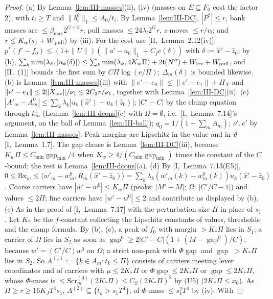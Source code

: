 \documentclass[10pt]{amsart}
\theoremstyle{definition}
\theoremstyle{remark}
\newcommand{\gap}{\operatorname{gap}}
\newcommand{\zh}{\hat z}
\newcommand{\ip}[2]{\langle #1,#2\rangle}
\begin{document}
\begin{proof}
(a) By Lemma~\ref{lem:III-masses}(ii), (iv) (masses on $E\subseteq F_0$ cost the
factor $2$), with $t_i\ge T$ and $\|b^\theta_i\|_1\le A_0/t_i$.  By
Lemma~\ref{lem:III-DC}, $|P^*|\le r$, bank masses are $\le\beta_{\max}2^{G+2}r$,
pull masses $\le24\lambda_l2^Gr$, $z$-moves $\le r/v_l$; and $r\le K_w(s_1+
\overline W_{\rm pull})$ by (iii).  For the cost use [II,~Lemma~2.12(iv)]:
$p^*(f'-f_0)\le(1+\|U\|)(\|a'-a_0\|_1+C_fc(\delta))$ with $\delta:=\hat x'-\zh_0$;
by (b), $\sum_k\min(\lambda_k,|u_k(\delta)|)\le\sum_k\min(\lambda_k,4K_w\Pi)+
2\mathfrak t(N'')+W_{\rm lev}+W_{\rm pull}$, and [II,~(1)] bounds the first sum
by $C\Pi\log(e/\Pi)$; $\Delta_m(\delta)$ is bounded likewise.  (b) is
Lemma~\ref{lem:III-masses}(iii) with $\|e'-e_0\|\le\|e'-e_1\|+\Pi_X$ and
$\|e'-e_1\|\le2\|X_{\rm lev}\|/\nu_1\le2C_2r/\nu_1$, together with
Lemma~\ref{lem:III-DC}(ii).  (c) $|A'_m-A^0_m|\le\sum_k\lambda_k|u_k(\hat x')-
u_k(\zh_0)|$; $|C'-C|$ by the clamp equation through $k^\natural_m$
(Lemma~\ref{lem:III-dcons}(c) with $\Omega=\emptyset$, i.e.\ [I,~Lemma~7.14]'s
argument, on the ball of Lemma~\ref{lem:III-ball}); $q_0=1/(1+\sum_mA_m)$;
$\nu',e'$ by Lemma~\ref{lem:III-masses}.  Peak margins are Lipschitz in the
value and in $\bar\vartheta$ [I,~Lemma~1.7].  The gap clause is
Lemma~\ref{lem:III-DC}(iii), because $K_w\Pi\le C_{\min}\gap_{\min}/4$ when
$K_w\ge4/(C_{\min}\gap_{\min})$ times the constant of the $C$-bound; the rest is
Lemma~\ref{lem:III-dcons}(a).
(d) By [I,~Lemma~7.13(E5)], $0\le\mathrm{Bx}_m\le\ip{w'_m-w^0_m}{R_m(\hat x'-
\zh_0)}=\sum_k\lambda_k(w'_m(k)-w^0_m(k))u_k(\hat x'-\zh_0)$.  Coarse carriers
have $|w'-w^0|\le K_w\Pi$ (peaks: $|M'-M|$; $\Omega$: $|C'/C-1|$) and values
$\le2\Pi$; fine carriers have $|w'-w^0|\le2$ and contribute as displayed by (b).
(e) As in the proof of [I,~Lemma~7.17] with the perturbation size $\Pi$ in place
of $s_1$.  Let $K_*$ be the $f$-constant collecting the Lipschitz constants of
values, thresholds and the clamp formula.  By (b), (c), a peak of $f_0$ with
margin $>K_*\Pi$ lies in $S_1$; a carrier of $\Omega$ lies in $S_2$ as soon as
$\gap^0\ge2|C'-C|(1+(M-\gap^0)/C)$, because $w'=(C'/C)w^0$ on $\Omega$; a
strict non-peak with $\Phi\gap$ and $\gap$ $>K_*\Pi$ lies in $S_2$.  So
$A^{(1)}:=\{k\in A_m:t_k\le\Pi\}$ consists of carriers meeting lever
coordinates and of carriers with $\mu\le2K_*\Pi$ or $\Phi\gap\le2K_*\Pi$ or
$\gap\le2K_*\Pi$, whose $\Phi$-mass is $\le\mathrm{Scr}^{(0)}_m(2K_*\Pi)\le
C_S(2K_*\Pi)^2$ by (U5) ($2K_*\Pi\le x_0$).  As $\Pi\ge r\ge16K_JT^4s_1$,
$A^{(2)}\subseteq\{t_k>s_1T^4\}$, of $\Phi$-mass $\le s_1^2T^4$ by (iv).  With

\end{proof}
\end{document}
